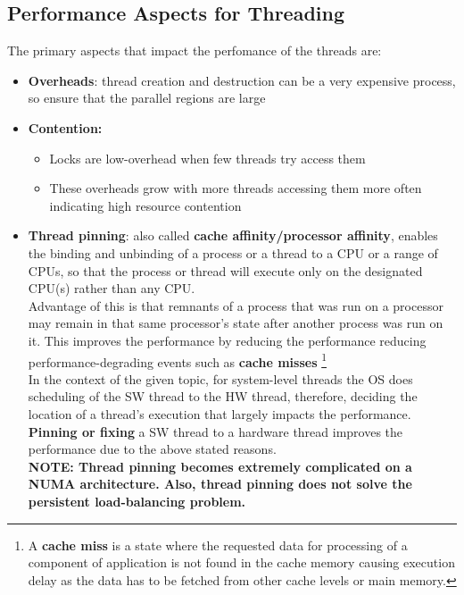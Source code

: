 \documentclass[12pt, a4paper]{report}
\begin{document}
\subsection{Performance Aspects for Threading}
The primary aspects that impact the perfomance of the threads are:
\begin{itemize}
    \item {\bfseries {Overheads}}: thread creation and destruction can be a very expensive process, so ensure that the parallel regions 
          are large        
    \item {\bfseries{Contention:}}
        \begin{itemize}
            \item Locks are low-overhead when few threads try access them
            \item These overheads grow with more threads accessing them more often indicating high resource contention
        \end{itemize}
    \item {\bfseries{Thread pinning}}: also called {\bfseries{cache affinity/processor affinity}}, enables the binding and unbinding of 
          a process or a thread to a CPU or a range of CPUs, so that the process or thread will execute only on the designated CPU(s) 
          rather than any CPU.\\
          Advantage of this is that remnants of a process that was run on a processor may remain in that same processor's state after
          another process was run on it. This improves the performance by reducing the performance reducing performance-degrading events
          such as {\bfseries{cache misses}} \footnote[8]{A {\bfseries{cache miss}} is a state where the requested data for processing
          of a component of application is not found in the cache memory causing execution delay as the data has to be fetched from 
          other cache levels or main memory.} \\
          In the context of the given topic, for system-level threads the OS does scheduling of the SW thread to the HW thread, therefore,
          deciding the location of a thread's execution that largely impacts the performance. {\bfseries{Pinning or fixing}} a SW thread 
          to a hardware thread improves the performance due to the above stated reasons.\\
          {\bfseries{NOTE:} Thread pinning becomes extremely complicated on a NUMA architecture. Also, thread pinning does not solve 
          the persistent load-balancing problem.}
\end{itemize}
\end{document}
